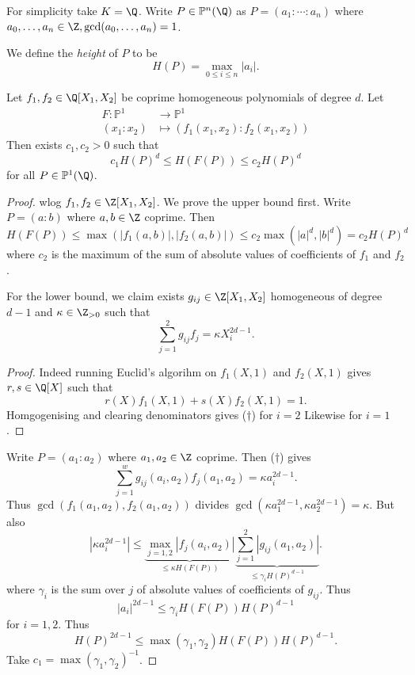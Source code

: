 \documentclass[a4paper]{article}
\theoremstyle{definition}
\renewcommand*{\P}{\mathbb{P}}
\begin{document}
For simplicity take \(K = \Q\). Write \(P \in \P^n(\Q)\) as \(P = (a_1: \cdots: a_n)\) where \(a_0, \dots, a_n \in \Z, \gcd(a_0, \dots, a_n) = 1\).

\begin{definition}[height]
  We define the \emph{height} of \(P\) to be
  \[
    H(P) = \max_{0 \leq i \leq n} |a_i|.
  \]
\end{definition}

\begin{lemma}
  Let \(f_1, f_2 \in \Q[X_1, X_2]\) be coprime homogeneous polynomials of degree \(d\). Let
  \begin{align*}
    F: \P^1 &\to \P^1 \\
    (x_1: x_2) &\mapsto (f_1(x_1, x_2): f_2(x_1, x_2))
  \end{align*}
  Then exists \(c_1, c_2 > 0\) such that
  \[
    c_1 H(P)^d \leq H(F(P)) \leq c_2 H(P)^d
  \]
  for all \(P \in \P^1(\Q)\).
\end{lemma}

\begin{proof}
  wlog \(f_1, f_2 \in \Z[X_1, X_2]\). We prove the upper bound first. Write \(P = (a: b)\) where \(a, b \in \Z\) coprime. Then
  \[
    H(F(P))
    \leq \max(|f_1(a, b)|, |f_2(a, b)|)
    \leq c_2 \max(|a|^d, |b|^d)
    = c_2 H(P)^d
  \]
  where \(c_2\) is the maximum of the sum of absolute values of coefficients of \(f_1\) and \(f_2\).

  For the lower bound, we claim exists \(g_{ij} \in \Z[X_1, X_2]\) homogeneous of degree \(d - 1\) and \(\kappa \in \Z_{> 0}\) such that
  \[
    \sum_{j = 1}^2 g_{ij}f_j = \kappa  X_i^{2d - 1}.
    \tag{\(\dagger\)}
  \]
  \begin{proof}
    Indeed running Euclid's algorihm on \(f_1(X, 1)\) and \(f_2(X, 1)\) gives \(r, s \in \Q[X]\) such that
    \[
      r(X) f_1(X, 1) + s(X) f_2(X, 1) = 1.
    \]
    Homgogenising and clearing denominators gives (\(\dagger\)) for \(i = 2\) Likewise for \(i = 1\).
  \end{proof}

  Write \(P = (a_1: a_2)\) where \(a_1, a_2 \in \Z\) coprime. Then (\(\dagger\)) gives
  \[
    \sum_{j = 1}^w g_{ij}(a_i, a_2) f_j(a_1, a_2) = \kappa a_i^{2d - 1}.
  \]
  Thus \(\gcd(f_1(a_1, a_2), f_2(a_1, a_2))\) divides \(\gcd(\kappa a_1^{2d - 1}, \kappa a_2^{2d - 1}) = \kappa\). But also
  \[
    |\kappa a_i^{2d - 1}| \leq \underbrace{\max_{j = 1, 2} |f_j (a_i, a_2)|}_{\leq \kappa H(F(P))} \underbrace{\sum_{j = 1}^2 |g_{ij}(a_1, a_2)|}_{\leq \gamma_i H(P)^{d - 1}}.
  \]
  where \(\gamma_i\) is the sum over \(j\) of absolute values of coefficients of \(g_{ij}\). Thus
  \[
    |a_i|^{2d - 1} \leq \gamma_i H(F(P)) H(P)^{d - 1}
  \]
  for \(i = 1, 2\). Thus
  \[
    H(P)^{2d - 1} \leq \max(\gamma_1, \gamma_2) H(F(P)) H(P)^{d - 1}.
  \]
  Take \(c_1 = \max(\gamma_1, \gamma_2)^{-1}\).
\end{proof}
\end{document}

